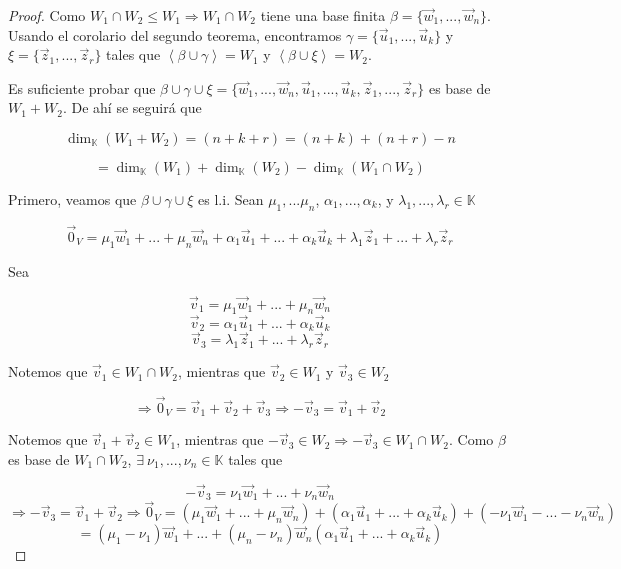 \documentclass[12pt]{article}
\newcommand\K{\ensuremath{\mathbb{K}}}
\begin{document}
\begin{proof}
    Como $W_1 \cap W_2 \leq W_1 \Rightarrow W_1 \cap W_2 $ tiene una base finita $\beta = \{ \vec{w}_1, ..., \vec{w}_n \}$. Usando el corolario del segundo teorema, encontramos $\gamma = \{ \vec{u}_1, ..., \vec{u}_k \}$ y $\xi = \{ \vec{z}_1, ..., \vec{z}_r \}$ tales que $\left\langle \beta \cup \gamma \right\rangle = W_1$ y  $\left\langle \beta \cup \xi \right\rangle = W_2$. 

    \bigskip

    Es suficiente probar que $\beta \cup \gamma \cup \xi = \{\vec{w}_1, ..., \vec{w}_n, \vec{u}_1, ..., \vec{u}_k, \vec{z}_1, ..., \vec{z}_r  \}$ es base de $W_1+W_2$. De ahí se seguirá que 

    $${\dim}_{\K}(W_1+W_2) = (n+k+r) = (n+k) + (n+r) - n $$

    $$=  {\dim}_{\K}(W_1) + {\dim}_{\K}(W_2) - {\dim}_{\K}(W_1 \cap W_2)$$

    Primero, veamos que  $\beta \cup \gamma \cup \xi $ es l.i. Sean $\mu_1, ... \mu_n$, $\alpha_1, ..., \alpha_k$, y $\lambda_1, ..., \lambda_r \in \K$ 

    $$ \vec{0}_V = \mu_1 \vec{w}_1 +  ... + \mu_n \vec{w}_n +  \alpha_1\vec{u}_1 + ... + \alpha_k\vec{u}_k + \lambda_1\vec{z}_1 + ...+ \lambda_r\vec{z}_r$$

    Sea

    $$\vec{v}_1 = \mu_1 \vec{w}_1 +  ... + \mu_n \vec{w}_n$$
    $$\vec{v}_2 = \alpha_1\vec{u}_1 + ... + \alpha_k\vec{u}_k$$
    $$\vec{v}_3 = \lambda_1\vec{z}_1 + ...+ \lambda_r\vec{z}_r$$

    Notemos que $\vec{v}_1 \in W_1 \cap W_2$, mientras que $\vec{v}_2 \in W_1 $ y $\vec{v}_3 \in W_2$

    $$\Rightarrow \vec{0}_V = \vec{v}_1 + \vec{v}_2 + \vec{v}_3 \Rightarrow -\vec{v}_3 = \vec{v}_1 + \vec{v}_2$$

    Notemos que $\vec{v}_1 + \vec{v}_2 \in W_1$, mientras que $-\vec{v}_3 \in W_2 \Rightarrow  -\vec{v}_3 \in W_1 \cap W_2$. Como $\beta$ es base de $ W_1 \cap W_2$, $\exists \: \nu_1, ..., \nu_n \in \K$ tales que

    $$-\vec{v}_3  = \nu_1\vec{w}_1 + ... + \nu_n\vec{w}_n $$
    $$\Rightarrow -\vec{v}_3 = \vec{v}_1 + \vec{v}_2 \Rightarrow  \vec{0}_V =  (\mu_1 \vec{w}_1 +  ... + \mu_n \vec{w}_n)+ (\alpha_1\vec{u}_1 + ... + \alpha_k\vec{u}_k) + (-\nu_1\vec{w}_1 - ... - \nu_n\vec{w}_n)$$
    $$= (\mu_1-\nu_1)\vec{w}_1  + ... + (\mu_n-\nu_n)\vec{w}_n  (\alpha_1\vec{u}_1 + ... + \alpha_k\vec{u}_k)$$


\end{proof}
\end{document}
